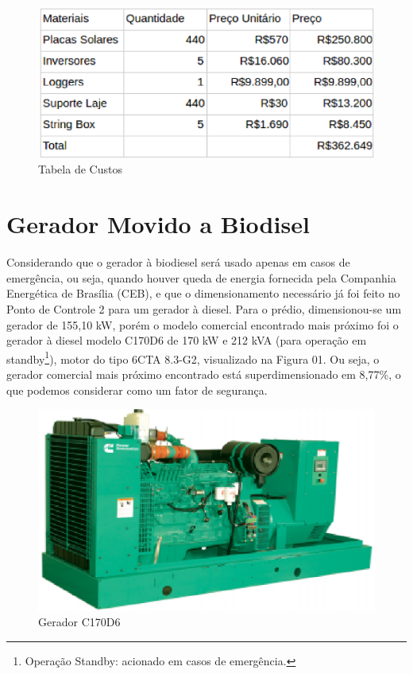\begin{figure}[!ht]
  \centering
  \includegraphics[keepaspectratio=true,scale=0.6]{figuras/SmartGrid_Tabela_de_Custos.eps}
  \caption{Tabela de Custos}
  \label{fig:tabela_custos}
\end{figure}

\section{Gerador Movido a Biodisel}
Considerando que o gerador à biodiesel será usado apenas em casos de emergência, ou seja, quando houver queda de energia fornecida pela Companhia Energética de Brasília (CEB), e que o dimensionamento necessário já foi feito no Ponto de Controle 2 para um gerador à diesel.
Para o prédio, dimensionou-se um gerador de 155,10 kW, porém o modelo comercial encontrado mais próximo foi o gerador à diesel modelo C170D6 de 170 kW e 212 kVA (para operação em standby\footnote{Operação Standby: acionado em casos de emergência.}), motor do tipo 6CTA 8.3-G2, visualizado na Figura 01. Ou seja, o gerador comercial mais próximo encontrado está superdimensionado em 8,77\%, o que podemos considerar como um fator de segurança.

\begin{figure}[!ht]
  \centering
  \includegraphics[keepaspectratio=true,scale=0.6]{figuras/gerador.eps}
  \caption{Gerador C170D6}
  \label{fig:gerador}
\end{figure}

